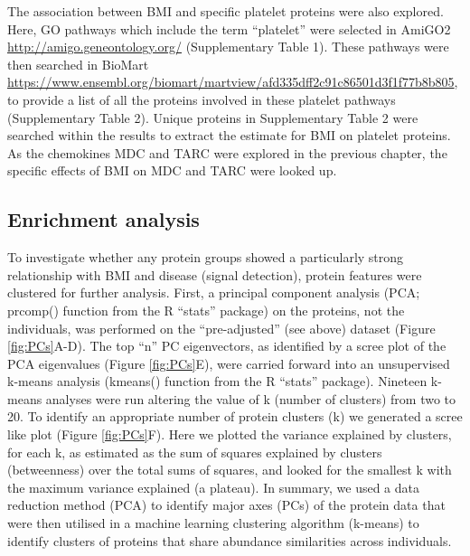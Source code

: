 \documentclass[11pt,twoside]{bristolthesis}
\begin{document}
The association between BMI and specific platelet proteins were also explored. Here, GO pathways which include the term ``platelet'' were selected in AmiGO2 \url{http://amigo.geneontology.org/} (Supplementary Table 1). These pathways were then searched in BioMart \url{https://www.ensembl.org/biomart/martview/afd335dff2c91c86501d3f1f77b8b805}, to provide a list of all the proteins involved in these platelet pathways (Supplementary Table 2). Unique proteins in Supplementary Table 2 were searched within the results to extract the estimate for BMI on platelet proteins. As the chemokines MDC and TARC were explored in the previous chapter, the specific effects of BMI on MDC and TARC were looked up.

\hypertarget{enrichment-analysis}{%
\subsection{Enrichment analysis}\label{enrichment-analysis}}

To investigate whether any protein groups showed a particularly strong relationship with BMI and disease (signal detection), protein features were clustered for further analysis. First, a principal component analysis (PCA; prcomp() function from the R ``stats'' package) on the proteins, not the individuals, was performed on the ``pre-adjusted'' (see above) dataset (Figure \ref{fig:PCs}A-D). The top ``n'' PC eigenvectors, as identified by a scree plot of the PCA eigenvalues (Figure \ref{fig:PCs}E), were carried forward into an unsupervised k-means analysis (kmeans() function from the R ``stats'' package). Nineteen k-means analyses were run altering the value of k (number of clusters) from two to 20. To identify an appropriate number of protein clusters (k) we generated a scree like plot (Figure \ref{fig:PCs}F). Here we plotted the variance explained by clusters, for each k, as estimated as the sum of squares explained by clusters (betweenness) over the total sums of squares, and looked for the smallest k with the maximum variance explained (a plateau). In summary, we used a data reduction method (PCA) to identify major axes (PCs) of the protein data that were then utilised in a machine learning clustering algorithm (k-means) to identify clusters of proteins that share abundance similarities across individuals.
\end{document}
